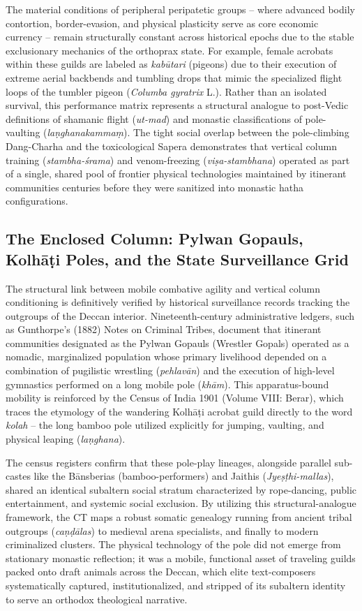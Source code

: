 \documentclass[11pt,twoside,letterpaper]{article}
\begin{document}
The material conditions of peripheral peripatetic groups – where advanced bodily contortion, border-evasion, and physical plasticity serve as core economic currency – remain structurally constant across historical epochs due to the stable exclusionary mechanics of the orthoprax state. For example, female acrobats within these guilds are labeled as \textit{kabūtari} (pigeons) due to their execution of extreme aerial backbends and tumbling drops that mimic the specialized flight loops of the tumbler pigeon (\textit{Columba gyratrix} L.). Rather than an isolated survival, this performance matrix represents a structural analogue to post-Vedic definitions of shamanic flight (\textit{ut-mad}) and monastic classifications of pole-vaulting (\textit{laṇghanakammaṃ}). The tight social overlap between the pole-climbing Dang-Charha and the toxicological Sapera demonstrates that vertical column training (\textit{stambha-śrama}) and venom-freezing (\textit{viṣa-stambhana}) operated as part of a single, shared pool of frontier physical technologies maintained by itinerant communities centuries before they were sanitized into monastic hatha configurations.

\subsection{The Enclosed Column: Pylwan Gopauls, Kolhāṭi Poles, and the State Surveillance Grid}
The structural link between mobile combative agility and vertical column conditioning is definitively verified by historical surveillance records tracking the outgroups of the Deccan interior. Nineteenth-century administrative ledgers, such as Gunthorpe’s (1882) Notes on Criminal Tribes, document that itinerant communities designated as the Pylwan Gopauls (Wrestler Gopals) operated as a nomadic, marginalized population whose primary livelihood depended on a combination of pugilistic wrestling (\textit{pehlavān}) and the execution of high-level gymnastics performed on a long mobile pole (\textit{khām}). This apparatus-bound mobility is reinforced by the Census of India 1901 (Volume VIII: Berar), which traces the etymology of the wandering Kolhāṭi acrobat guild directly to the word \textit{kolah} – the long bamboo pole utilized explicitly for jumping, vaulting, and physical leaping (\textit{laṇghana}).

The census registers confirm that these pole-play lineages, alongside parallel sub-castes like the Bānsberias (bamboo-performers) and Jaithis (\textit{Jyeṣṭhi-mallas}), shared an identical subaltern social stratum characterized by rope-dancing, public entertainment, and systemic social exclusion. By utilizing this structural-analogue framework, the CT maps a robust somatic genealogy running from ancient tribal outgroups (\textit{caṇḍālas}) to medieval arena specialists, and finally to modern criminalized clusters. The physical technology of the pole did not emerge from stationary monastic reflection; it was a mobile, functional asset of traveling guilds packed onto draft animals across the Deccan, which elite text-composers systematically captured, institutionalized, and stripped of its subaltern identity to serve an orthodox theological narrative.
\end{document}
